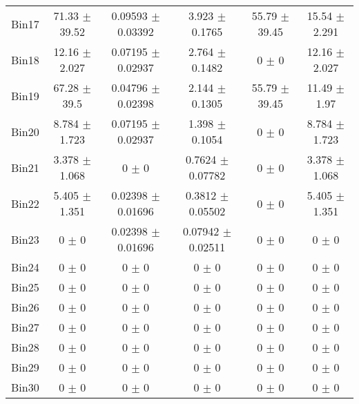 \begin{tabular}{@{\extracolsep{4pt}}lccccc@{}}
     Bin17 & 71.33 $\pm$ 39.52 & 0.09593 $\pm$ 0.03392 & 3.923 $\pm$ 0.1765 & 55.79 $\pm$ 39.45 & 15.54 $\pm$ 2.291 \\ 
     Bin18 & 12.16 $\pm$ 2.027 & 0.07195 $\pm$ 0.02937 & 2.764 $\pm$ 0.1482 & 0 $\pm$ 0 & 12.16 $\pm$ 2.027 \\ 
     Bin19 & 67.28 $\pm$ 39.5 & 0.04796 $\pm$ 0.02398 & 2.144 $\pm$ 0.1305 & 55.79 $\pm$ 39.45 & 11.49 $\pm$ 1.97 \\ 
     Bin20 & 8.784 $\pm$ 1.723 & 0.07195 $\pm$ 0.02937 & 1.398 $\pm$ 0.1054 & 0 $\pm$ 0 & 8.784 $\pm$ 1.723 \\ 
     Bin21 & 3.378 $\pm$ 1.068 & 0 $\pm$ 0 & 0.7624 $\pm$ 0.07782 & 0 $\pm$ 0 & 3.378 $\pm$ 1.068 \\ 
     Bin22 & 5.405 $\pm$ 1.351 & 0.02398 $\pm$ 0.01696 & 0.3812 $\pm$ 0.05502 & 0 $\pm$ 0 & 5.405 $\pm$ 1.351 \\ 
     Bin23 & 0 $\pm$ 0 & 0.02398 $\pm$ 0.01696 & 0.07942 $\pm$ 0.02511 & 0 $\pm$ 0 & 0 $\pm$ 0 \\ 
     Bin24 & 0 $\pm$ 0 & 0 $\pm$ 0 & 0 $\pm$ 0 & 0 $\pm$ 0 & 0 $\pm$ 0 \\ 
     Bin25 & 0 $\pm$ 0 & 0 $\pm$ 0 & 0 $\pm$ 0 & 0 $\pm$ 0 & 0 $\pm$ 0 \\ 
     Bin26 & 0 $\pm$ 0 & 0 $\pm$ 0 & 0 $\pm$ 0 & 0 $\pm$ 0 & 0 $\pm$ 0 \\ 
     Bin27 & 0 $\pm$ 0 & 0 $\pm$ 0 & 0 $\pm$ 0 & 0 $\pm$ 0 & 0 $\pm$ 0 \\ 
     Bin28 & 0 $\pm$ 0 & 0 $\pm$ 0 & 0 $\pm$ 0 & 0 $\pm$ 0 & 0 $\pm$ 0 \\ 
     Bin29 & 0 $\pm$ 0 & 0 $\pm$ 0 & 0 $\pm$ 0 & 0 $\pm$ 0 & 0 $\pm$ 0 \\ 
     Bin30 & 0 $\pm$ 0 & 0 $\pm$ 0 & 0 $\pm$ 0 & 0 $\pm$ 0 & 0 $\pm$ 0 \\ 
\hline\hline
  \end{tabular}

